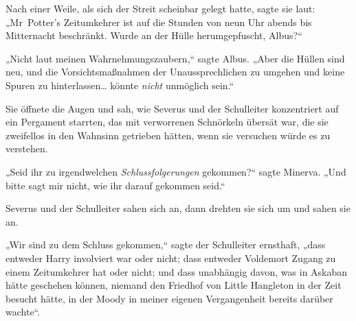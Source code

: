 Nach einer Weile, als sich der Streit scheinbar gelegt hatte, sagte sie laut: „Mr~Potter's Zeitumkehrer ist auf die Stunden von neun Uhr abends bis Mitternacht beschränkt. Wurde an der Hülle herumgepfuscht, Albus?“

„Nicht laut meinen Wahrnehmungszaubern,“ sagte Albus. „Aber die Hüllen sind neu, und die Vorsichtsmaßnahmen der Unaussprechlichen zu umgehen und keine Spuren zu hinterlassen… könnte \emph{nicht} unmöglich sein.“

Sie öffnete die Augen und sah, wie Severus und der Schulleiter konzentriert auf ein Pergament starrten, das mit verworrenen Schnörkeln übersät war, die sie zweifellos in den Wahnsinn getrieben hätten, wenn sie versuchen würde es zu verstehen.

„Seid ihr zu irgendwelchen \emph{Schlussfolgerungen} gekommen?“ sagte Minerva. „Und bitte sagt mir nicht, wie ihr darauf gekommen seid.“

Severus und der Schulleiter sahen sich an, dann drehten sie sich um und sahen sie an.

„Wir sind zu dem Schluss gekommen,“ sagte der Schulleiter ernsthaft, „dass entweder Harry involviert war oder nicht; dass entweder Voldemort Zugang zu einem Zeitumkehrer hat oder nicht; und dass unabhängig davon, was in Askaban hätte geschehen können, niemand den Friedhof von Little Hangleton in der Zeit besucht hätte, in der Moody in meiner eigenen Vergangenheit bereits darüber wachte“.

